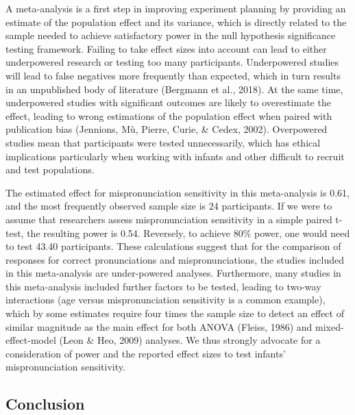 \documentclass[man]{apa6}
\begin{document}
A meta-analysis is a first step in improving experiment planning by providing an estimate of the population effect and its variance, which is directly related to the sample needed to achieve satisfactory power in the null hypothesis significance testing framework. Failing to take effect sizes into account can lead to either underpowered research or testing too many participants. Underpowered studies will lead to false negatives more frequently than expected, which in turn results in an unpublished body of literature (Bergmann et al., 2018). At the same time, underpowered studies with significant outcomes are likely to overestimate the effect, leading to wrong estimations of the population effect when paired with publication bias (Jennions, Mù, Pierre, Curie, \& Cedex, 2002). Overpowered studies mean that participants were tested unnecessarily, which has ethical implications particularly when working with infants and other difficult to recruit and test populations.

The estimated effect for mispronunciation sensitivity in this meta-analysis is 0.61, and the most frequently observed sample size is 24 participants. If we were to assume that researchers assess mispronunciation sensitivity in a simple paired t-test, the resulting power is 0.54. Reversely, to achieve 80\% power, one would need to test 43.40 participants. These calculations suggest that for the comparison of responses for correct pronunciations and mispronunciations, the studies included in this meta-analysis are under-powered analyses. Furthermore, many studies in this meta-analysis included further factors to be tested, leading to two-way interactions (age versus mispronunciation sensitivity is a common example), which by some estimates require four times the sample size to detect an effect of similar magnitude as the main effect for both ANOVA (Fleiss, 1986) and mixed-effect-model (Leon \& Heo, 2009) analyses. We thus strongly advocate for a consideration of power and the reported effect sizes to test infants' mispronunciation sensitivity.

\hypertarget{conclusion}{%
\subsection{Conclusion}\label{conclusion}}
\end{document}
